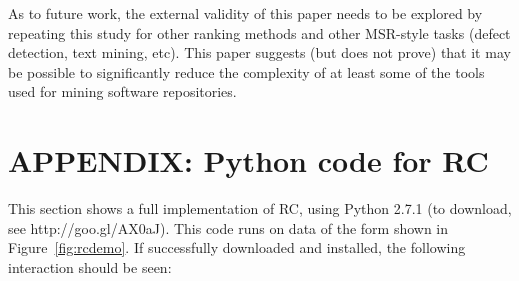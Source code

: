 \documentclass{sig-alternate}
\newcommand{\fig}[1]{Figure~\ref{fig:#1}}
\begin{document}
As to future work, the external validity of this paper
needs to be explored
by repeating this study
for other ranking methods and other
MSR-style  tasks (defect detection, text mining,
etc). This paper suggests (but does not prove)
that it may be possible to significantly reduce the
complexity of at least some of the tools used for mining
software repositories.








%
%


{\small


}

\section*{APPENDIX: Python code for RC}
This section shows a full implementation of
RC, using Python 2.7.1 (to download, see
http://goo.gl/AX0aJ).
This code runs on data of the form shown in \fig{rcdemo}. If successfully downloaded and installed,
the following interaction should be seen:
\end{document}
